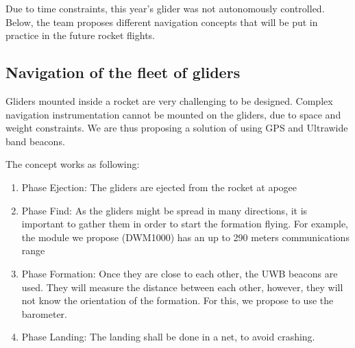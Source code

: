 Due to time constraints, this year's glider was not autonomously controlled. Below, the team proposes different navigation concepts that will be put in practice in the future rocket flights.


\subsection{Navigation of the fleet of gliders}

Gliders mounted inside a rocket are very challenging to be designed. 
Complex navigation instrumentation cannot be mounted on the gliders, due to space and weight constraints. 
We are thus proposing a solution of using GPS and Ultrawide band beacons.

The concept works as following:

\begin{enumerate}
    \item Phase Ejection: The gliders are ejected from the rocket at apogee
    \item Phase Find: As the gliders might be spread in many directions, it is important to gather them in order to start the formation flying. For example, the module we propose (DWM1000) has an up to 290 meters communications range
    \item Phase Formation: Once they are close to each other, the UWB beacons are used. They will measure the distance between each other, however, they will not know the orientation of the formation. For this, we propose to use the barometer.
    \item Phase Landing: The landing shall be done in a net, to avoid crashing.
\end{enumerate}









